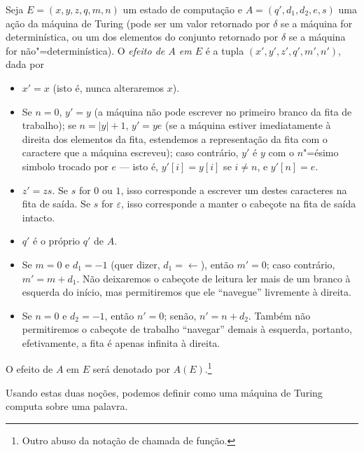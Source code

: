 Seja $E = (x, y, z, q, m, n)$ um estado de computação
e $A = (q', d_1, d_2, e, s)$ uma ação da máquina de Turing
(pode ser um valor retornado por $\delta$ se a máquina for determinística,
ou um dos elementos do conjunto retornado por $\delta$
se a máquina for não"=determinística).
O \emph{efeito de $A$ em $E$}
é a tupla $(x', y', z', q', m', n')$,
dada por
\begin{itemize}
    \setlength{\labelsep}{1ex}
    \item $x' = x$ (isto é, nunca alteraremos $x$).
    \item Se $n = 0$, $y' = y$
        (a máquina não pode escrever no primeiro branco da fita de trabalho);
        se $n = |y| + 1$, $y' = ye$
        (se a máquina estiver imediatamente à direita dos elementos da fita,
        estendemos a representação da fita com o caractere que a máquina escreveu);
        caso contrário,
        $y'$ é $y$ com o $n$"=ésimo simbolo trocado por $e$
        --- isto é, $y'[i] = y[i]$ se $i \neq n$, e $y'[n] = e$.
    \item $z' = zs$.
        Se $s$ for $0$ ou $1$,
        isso corresponde a escrever um destes caracteres na fita de saída.
        Se $s$ for $\varepsilon$,
        isso corresponde a manter o cabeçote na fita de saída intacto.
    \item $q'$ é o próprio $q'$ de $A$.
    \item Se $m = 0$ e $d_1 = -1$ (quer dizer, $d_1 = \leftarrow$),
        então $m' = 0$; caso contrário, $m' = m + d_1$.
        Não deixaremos o cabeçote de leitura ler mais de um branco
        à esquerda do início,
        mas permitiremos que ele ``navegue'' livremente à direita.
    \item Se $n = 0$ e $d_2 = -1$, então $n' = 0$; senão, $n' = n + d_2$.
        Também não permitiremos o cabeçote de trabalho ``navegar'' demais à esquerda,
        portanto, efetivamente,
        a fita é apenas infinita à direita.
\end{itemize}
\begin{notation}
    O efeito de $A$ em $E$ será denotado por $A(E)$.\footnote{
        Outro abuso da notação de chamada de função.
    }
\end{notation}

Usando estas duas noções,
podemos definir como uma máquina de Turing computa sobre uma palavra.

